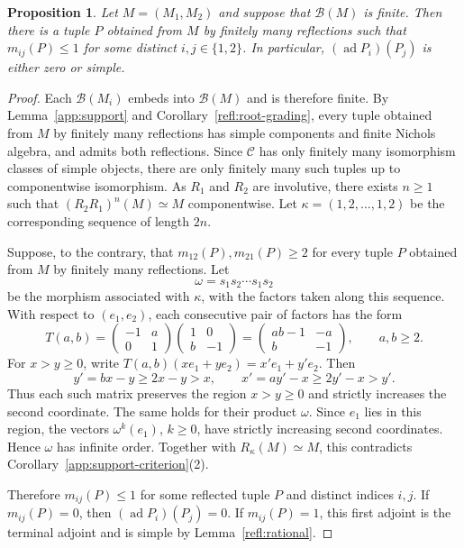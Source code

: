 \documentclass[11pt, a4paper]{article}
\numberwithin{equation}{section}
\newcommand{\C}{\mathcal C}
\newcommand{\B}{\mathcal B}
\DeclareMathOperator{\ad}{ad}
\newtheorem{proposition}[theorem]{Proposition}
\begin{document}
\begin{proposition}\label{app:rank-two-obstruction}
Let $M=(M_1,M_2)$ and suppose that $\B(M)$ is finite.
Then there is a tuple $P$ obtained from $M$ by finitely many
reflections such that $m_{ij}(P)\le1$ for some distinct
$i,j\in\{1,2\}$. In particular, $(\ad P_i)(P_j)$ is either
zero or simple.
\end{proposition}

\begin{proof}Each $\B(M_i)$ embeds into $\B(M)$ and is therefore finite.
By Lemma~\ref{app:support} and
Corollary~\ref{refl:root-grading}, every tuple obtained from
$M$ by finitely many reflections has simple components and
finite Nichols algebra, and admits both reflections.
Since $\C$ has only finitely many isomorphism classes of
simple objects, there are only finitely many such tuples
up to componentwise isomorphism. As $R_1$ and $R_2$ are
involutive, there exists $n\ge1$ such that
$(R_2R_1)^n(M)\simeq M$ componentwise.
Let $\kappa=(1,2,\ldots,1,2)$ be the corresponding sequence
of length $2n$.

Suppose, to the contrary, that
$m_{12}(P),m_{21}(P)\ge2$ for every tuple $P$ obtained from
$M$ by finitely many reflections.
Let
\[
 \omega= {s_1s_2\cdots s_1s_2}
\]
be the morphism associated with $\kappa$, with
the factors taken along this sequence. With respect to
$(e_1,e_2)$, each consecutive pair of factors has the form
\[
 T(a,b)=
 \begin{pmatrix}-1&a\\0&1\end{pmatrix}
 \begin{pmatrix}1&0\\b&-1\end{pmatrix}
 =
 \begin{pmatrix}ab-1&-a\\b&-1\end{pmatrix},
 \qquad a,b\ge2.
\]
For $x>y\ge0$, write
$T(a,b)(xe_1+ye_2)=x'e_1+y'e_2$. Then
\[
 y'=bx-y\ge2x-y>x,\qquad
 x'=ay'-x\ge2y'-x>y'.
\]
Thus each such matrix preserves the region $x>y\ge0$ and
strictly increases the second coordinate. The same holds for
their product $\omega$. Since $e_1$ lies in this region, the
vectors $\omega^k(e_1)$, $k\ge0$, have strictly increasing
second coordinates. Hence $\omega$ has infinite order.
Together with $R_\kappa(M)\simeq M$, this contradicts
Corollary~\ref{app:support-criterion}\textup{(2)}.

Therefore $m_{ij}(P)\le1$ for some reflected tuple $P$ and
distinct indices $i,j$. If $m_{ij}(P)=0$, then
$(\ad P_i)(P_j)=0$. If $m_{ij}(P)=1$, this first adjoint is
the terminal adjoint and is simple by
Lemma~\ref{refl:rational}.
\end{proof}
\end{document}
